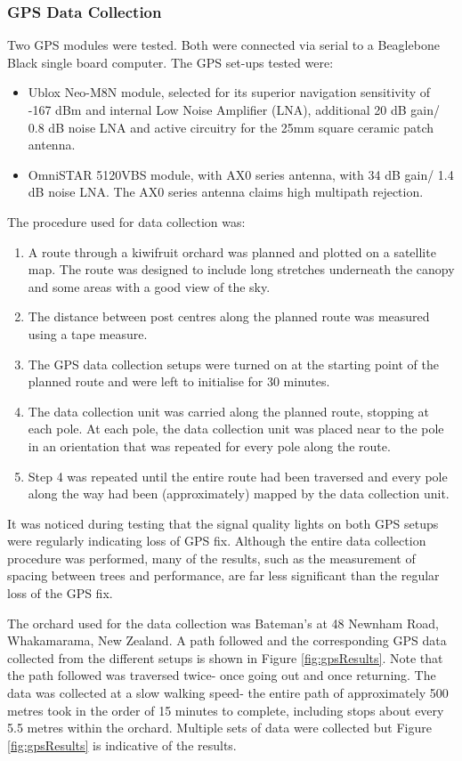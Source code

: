 \documentclass[preprint,authoryear,12pt]{elsarticle}
\begin{document}
\subsubsection{GPS Data Collection}
    Two GPS modules were tested. Both were connected via serial to a Beaglebone Black single board  computer. The GPS set-ups tested were:
    \begin{itemize}
      \item Ublox Neo-M8N module, selected for its superior navigation sensitivity of -167 dBm and internal Low Noise Amplifier (LNA), additional 20 dB gain/ 0.8 dB noise LNA and active circuitry for the 25mm square ceramic patch antenna.
      \item OmniSTAR 5120VBS module, with AX0 series antenna, with 34 dB gain/ 1.4 dB noise LNA. The AX0 series antenna claims high multipath rejection.
    \end{itemize}
    The procedure used for data collection was:
    \begin{enumerate}
        \item A route through a kiwifruit orchard was planned and plotted on a satellite map. The route was designed to include long stretches underneath the canopy and some areas with a good view of the sky.
        \item The distance between post centres along the planned route was measured using a tape measure.
        \item The GPS data collection setups were turned on at the starting point of the planned route and were left to initialise for 30 minutes.
        \item The data collection unit was carried along the planned route, stopping at each pole. At each pole, the data collection unit was placed near to the pole in an orientation that was repeated for every pole along the route.
        \item Step 4 was repeated until the entire route had been traversed and every pole along the way had been (approximately) mapped by the data collection unit.
    \end{enumerate}

    It was noticed during testing that the signal quality lights on both GPS setups were regularly indicating loss of GPS fix. Although the entire data collection procedure was performed, many of the results, such as the measurement of spacing between trees and performance, are far less significant than the regular loss of the GPS fix.

    The orchard used for the data collection was Bateman’s at 48 Newnham Road, Whakamarama, New Zealand. A path followed and the corresponding GPS data collected from the different setups is shown in Figure \ref{fig:gpsResults}. Note that the path followed was traversed twice- once going out and once returning. The data was collected at a slow walking speed- the entire path of approximately 500 metres took in the order of 15 minutes to complete, including stops about every 5.5 metres within the orchard. Multiple sets of data were collected but Figure \ref{fig:gpsResults} is indicative of the results.
\end{document}
